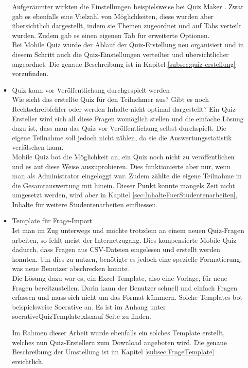 \begin{itemize}
		Aufgeräumter wirkten die Einstellungen beispielsweise bei Quiz Maker \cite{quiz-maker}. Zwar gab es ebenfalls eine Vielzahl von Möglichkeiten, diese wurden aber übersichtlich dargestellt, indem sie Themen zugeordnet und auf Tabs verteilt wurden. Zudem gab es einen eigenen Tab für erweiterte Optionen. \\
		Bei Mobile Quiz wurde der Ablauf der Quiz-Erstellung neu organisiert und in diesem Schritt auch die Quiz-Einstellungen verteilter und übersichtlicher angeordnet. Die genaue Beschreibung ist in Kapitel \ref{subsec:quiz-erstellung} vorzufinden.
		
		
		
		\item Quiz kann vor Veröffentlichung durchgespielt werden \\
		Wie sieht das erstellte Quiz für den Teilnehmer aus? Gibt es noch Rechtschreibfehler oder werden Inhalte nicht optimal dargestellt? Ein Quiz-Ersteller wird sich all diese Fragen womöglich stellen und die einfache Lösung dazu ist, dass man das Quiz vor Veröffentlichung selbst durchspielt. Die eigene Teilnahme soll jedoch nicht zählen, da sie die Auswertungsstatistik verfälschen kann. \\
		Mobile Quiz bot die Möglichkeit an, ein Quiz noch nicht zu veröffentlichen und es auf diese Weise auszuprobieren. Dies funktionierte aber nur, wenn man als Administrator eingeloggt war. Zudem zählte die eigene Teilnahme in die Gesamtauswertung mit hinein.
		Dieser Punkt konnte mangels Zeit nicht umgesetzt werden, wird aber in Kapitel \ref{sec:InhalteFuerStudentenarbeiten}, Inhalte für weitere Studentenarbeiten einfliessen.
		
		
		\item Template für Frage-Import \\
		Ist man im Zug unterwegs und möchte trotzdem an einem neuen Quiz-Fragen arbeiten, so fehlt meist der Internetzugang. Dies kompensierte Mobile Quiz dadurch, dass Fragen aus \gls{CSV}-Dateien eingelesen und erstellt werden konnten. Um dies zu nutzen, benötigte es jedoch eine spezielle Formatierung, was neue Benutzer abschrecken konnte. \\
		Die Lösung dazu war es, ein Excel-Template, also eine Vorlage, für neue Fragen bereitzustellen. Darin kann der Benutzer schnell und einfach Fragen erfassen und muss sich nicht um das Format kümmern. Solche Templates bot beispielsweise
		Socrative \cite{socrative.com} an. Es ist im Anhang unter \glqq socrativeQuizTemplate.xlsx\grqq auf Seite \hyperlink{page.\getpagerefnumber{pdf:socrative}}{} zu finden.
		
		Im Rahmen dieser Arbeit wurde ebenfalls ein solches Template erstellt, welches nun Quiz-Erstellern zum Download angeboten wird. Die genaue Beschreibung der Umstellung ist im Kapitel \ref{subsec:FrageTemplate} ersichtlich.
		
	\end{itemize}